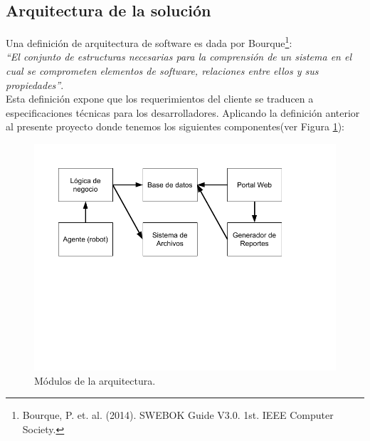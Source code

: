 \documentclass[letterpaper,11pt]{article}
\begin{document}
\subsection{Arquitectura de la solución}
Una definición de arquitectura de software es dada por Bourque\footnote{Bourque, P. et. al. (2014). SWEBOK Guide V3.0. 1st. IEEE Computer Society.}:\\
\textit{``El conjunto de estructuras necesarias para la comprensión de un sistema en el cual se comprometen elementos de software, relaciones entre ellos y sus propiedades''}.\\
Esta definición expone que los requerimientos del cliente se traducen a especificaciones técnicas para los desarrolladores. Aplicando la definición anterior al presente proyecto donde tenemos los siguientes componentes(ver Figura \ref{fig:dia-arq-comp}):
\begin{figure}[h]
\centering
\includegraphics[scale=0.45]{dia-arq-comp} 
\caption{Módulos de la arquitectura.}
\label{fig:dia-arq-comp}
\end{figure}
\end{document}
